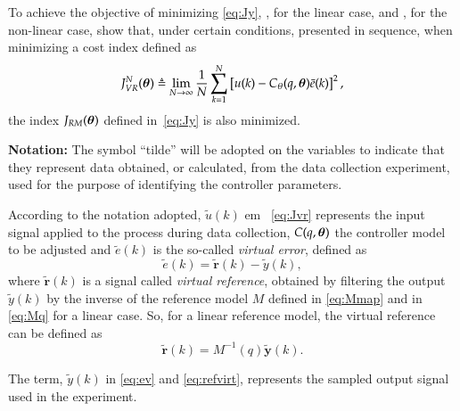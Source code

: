 To achieve the objective of minimizing \eqref{eq:Jy}, \cite{campi2002}, for the linear case, and \cite{campi2006}, for the non-linear case, show that, under certain conditions, presented in sequence, when minimizing a cost index defined as
\begin{equation}
   J_{VR}^N(\bm{\theta}) \triangleq \lim_{N \to \infty}  \frac{1}{N} \sum_{k=1}^N \left[u(k) - C_\theta(q,\bm{\theta})\bar{e}(k)\right]^2
   \label{eq:Jvr},
\end{equation}
the index $J_{RM}(\bm{\theta})$ defined in~\eqref{eq:Jy} is also minimized.

\textbf{Notation:} The symbol ``tilde'' will be adopted on the variables to indicate that they represent data obtained, or calculated, from the data collection experiment, used for the purpose of identifying the controller parameters.

According to the notation adopted, $\tilde{u}(k)$ em ~\eqref{eq:Jvr} represents the input signal applied to the process during data collection, $C (q,\bm{\theta})$ the controller model to be adjusted and $\tilde{e}(k)$ is the so-called \textit{virtual error}, defined as
\begin{equation}
   \tilde{e}(k) = \tilde{\bm{r}}(k) - \tilde{y}(k) 
   \label{eq:ev},
\end{equation}
where $\tilde{\bm{r}}(k)$ is a signal called \textit{virtual reference}, obtained by filtering the output $\tilde{y}(k)$ by the inverse of the reference model $M$ defined in  \eqref{eq:Mmap} and in \eqref{eq:Mq} for a linear case. So, for a linear reference model, the virtual reference can be defined as
\begin{equation}
   \tilde{\bm{r}}(k) = M^{-1}(q){\tilde{\bm{y}}}(k)
   \label{eq:refvirt}.
\end{equation}

The term, $\tilde{y}(k)$ in \eqref{eq:ev} and \eqref{eq:refvirt}, represents the sampled output signal used in the experiment.

